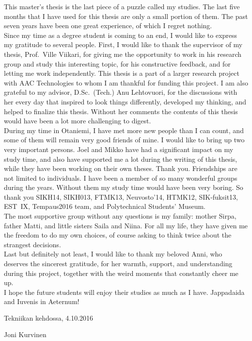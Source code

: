 {\parindent0pt
This master's thesis is the last piece of a puzzle called my studies. The last five months that I have used for this thesis are only a small portion of them. The past seven years have been one great experience, of which I regret nothing.\\

Since my time as a degree student is coming to an end, I would like to express my gratitude to several people. First, I would like to thank the supervisor of my thesis, Prof.\ Ville Viikari, for giving me the opportunity to work in his research group and study this interesting topic, for his constructive feedback, and for letting me work independently. This thesis is a part of a larger research project with AAC Technologies to whom I am thankful for funding this project. I am also grateful to my advisor, D.Sc.\ (Tech.) Anu Lehtovuori, for the discussions with her every day that inspired to look things differently, developed my thinking, and helped to finalize this thesis. Without her comments the contents of this thesis would have been a lot more challenging to digest.\\

During my time in Otaniemi, I have met more new people than I can count, and some of them will remain very good friends of mine. I would like to bring up two very important persons. Joel and Mikko have had a significant impact on my study time, and also have supported me a lot during the writing of this thesis, while they have been working on their own theses. Thank you. Friendships are not limited to individuals. I have been a member of so many wonderful groups during the years. Without them my study time would have been very boring. So thank you SIKH14, SIKH013, FTMK13, Neuvosto'14, HTMK12, SIK-fuksit13, EST~IX, Tempaus2016 team, and Polytechnical Students' Museum.\\

The most supportive group without any questions is my family: mother Sirpa, father Matti, and little sisters Saila and Niina. For all my life, they have given me the freedom to do my own choices, of course asking to think twice about the strangest decisions. \\

Last but definitely not least, I would like to thank my beloved Anni, who deserves the sincerest gratitude, for her warmth, support, and understanding during this project, together with the weird moments that constantly cheer me up. \\

I hope the future students will enjoy their studies as much as I have. Jappadaida and Iuvenis in Aeternum!}

\vspace{2cm}
Tekniikan kehdossa, 4.10.2016

\vspace{5mm}
{\hfill Joni Kurvinen \hspace{1cm}}